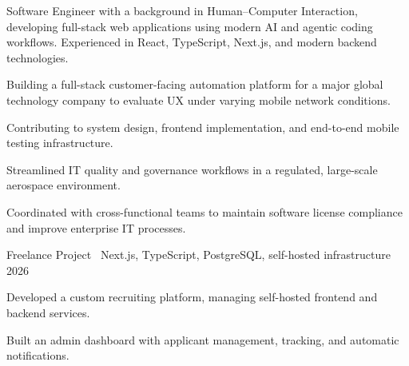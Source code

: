 \documentclass[10pt]{article}
\begin{document}
\makecvheader

Software Engineer with a background in Human–Computer Interaction, developing full-stack web applications using modern AI and agentic coding workflows. Experienced in React, TypeScript, Next.js, and modern backend technologies.


\begin{cvitems}
  \item Building a full-stack customer-facing automation platform for a major global
        technology company to evaluate UX under varying mobile network conditions.
  \item Contributing to system design, frontend implementation, and end-to-end
        mobile testing infrastructure.
\end{cvitems}

\begin{cvitems}
  \item Streamlined IT quality and governance workflows in a regulated,
        large-scale aerospace environment.
  \item Coordinated with cross-functional teams to maintain software license compliance and
        improve enterprise IT processes.
\end{cvitems}


%
  {Freelance Project \textbullet\ Next.js, TypeScript, PostgreSQL, self-hosted infrastructure}%
  {2026}
\begin{cvitems}
  \item Developed a custom recruiting platform, managing
        self-hosted frontend and backend services.
  \item Built an admin dashboard with applicant management, tracking, and automatic notifications.
\end{cvitems}
\end{document}
